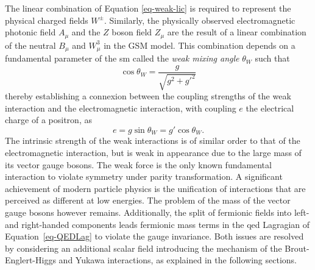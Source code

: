 The linear combination of Equation \ref{eq-weak-lic} is required to represent the physical charged fields $W^{\pm}$. Similarly, the physically observed electromagnetic photonic field $A_{\mu}$ and the $Z$ boson field $Z_{\mu}$ are the result of a linear combination of the neutral $B_{\mu}$ and $W_{\mu}^3$ in the GSM model. This combination depends on a fundamental parameter of the \gls{sm} called the \textit{weak mixing angle} $\theta_W$ such that
\begin{equation}\label{eq-weakmixangle}
    \cos\theta_W = \frac{g}{\sqrt{g^2 +g'^2}}
\end{equation}
thereby establishing a connexion between the coupling strengths of the weak interaction and the electromagnetic interaction, with coupling $e$ the electrical charge of a positron, as \[e = g \sin \theta_W = g' \cos\theta_W.\] The intrinsic strength of the weak interactions is of similar order to that of the electromagnetic interaction, but is weak in appearance due to the large mass of its vector gauge bosons. The weak force is the only known fundamental interaction to violate symmetry under parity transformation. A significant achievement of modern particle physics is the unification of interactions that are perceived as different at low energies. The problem of the mass of the vector gauge bosons however remains. Additionally, the split of fermionic fields into left- and right-handed components leads fermionic mass terms in the \gls{qed} Lagragian of Equation~\ref{eq-QEDLag} to violate the gauge invariance. Both issues are resolved by considering an additional scalar field introducing the mechanism of the Brout-Englert-Higgs and Yukawa interactions, as explained in the following sections.

